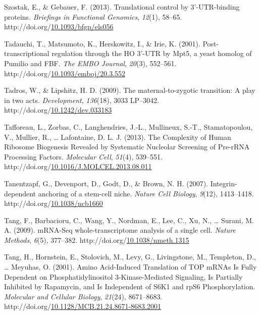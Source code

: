 \documentclass[12pt,oneside]{reedthesis}
\newlength{\cslhangindent}
\newenvironment{CSLReferences}[2] %
 {%
  \setlength{\parindent}{0pt}
  \ifodd #1 \everypar{\setlength{\hangindent}{\cslhangindent}}\ignorespaces\fi
  \ifnum #2 > 0
  \setlength{\parskip}{#2\baselineskip}
  \fi
 }%
 {}
\begin{document}
\begin{CSLReferences}{1}{0}
\leavevmode{}%
Szostak, E., \& Gebauer, F. (2013). Translational control by 3'-{UTR-binding} proteins. \emph{Briefings in Functional Genomics}, \emph{12}(1), 58--65. http://doi.org/\href{https://doi.org/10.1093/bfgp/els056}{10.1093/bfgp/els056}

\leavevmode{}%
Tadauchi, T., Matsumoto, K., Herskowitz, I., \& Irie, K. (2001). Post-transcriptional regulation through the {HO} 3'-{UTR} by {Mpt5}, a yeast homolog of {Pumilio} and {FBF}. \emph{The EMBO Journal}, \emph{20}(3), 552--561. http://doi.org/\href{https://doi.org/10.1093/emboj/20.3.552}{10.1093/emboj/20.3.552}

\leavevmode{}%
Tadros, W., \& Lipshitz, H. D. (2009). The maternal-to-zygotic transition: A play in two acts. \emph{Development}, \emph{136}(18), 3033 LP--3042. http://doi.org/\href{https://doi.org/10.1242/dev.033183}{10.1242/dev.033183}

\leavevmode{}%
Tafforeau, L., Zorbas, C., Langhendries, J.-L., Mullineux, S.-T., Stamatopoulou, V., Mullier, R., \ldots{} Lafontaine, D. L. J. (2013). The {Complexity} of {Human Ribosome Biogenesis Revealed} by {Systematic Nucleolar Screening} of {Pre-rRNA Processing Factors}. \emph{Molecular Cell}, \emph{51}(4), 539--551. http://doi.org/\href{https://doi.org/10.1016/J.MOLCEL.2013.08.011}{10.1016/J.MOLCEL.2013.08.011}

\leavevmode{}%
Tanentzapf, G., Devenport, D., Godt, D., \& Brown, N. H. (2007). Integrin-dependent anchoring of a stem-cell niche. \emph{Nature Cell Biology}, \emph{9}(12), 1413--1418. http://doi.org/\href{https://doi.org/10.1038/ncb1660}{10.1038/ncb1660}

\leavevmode{}%
Tang, F., Barbacioru, C., Wang, Y., Nordman, E., Lee, C., Xu, N., \ldots{} Surani, M. A. (2009). {mRNA-Seq} whole-transcriptome analysis of a single cell. \emph{Nature Methods}, \emph{6}(5), 377--382. http://doi.org/\href{https://doi.org/10.1038/nmeth.1315}{10.1038/nmeth.1315}

\leavevmode{}%
Tang, H., Hornstein, E., Stolovich, M., Levy, G., Livingstone, M., Templeton, D., \ldots{} Meyuhas, O. (2001). Amino {Acid-Induced Translation} of {TOP mRNAs Is Fully Dependent} on {Phosphatidylinositol} 3-{Kinase-Mediated Signaling}, {Is Partially Inhibited} by {Rapamycin}, and {Is Independent} of {S6K1} and {rpS6 Phosphorylation}. \emph{Molecular and Cellular Biology}, \emph{21}(24), 8671--8683. http://doi.org/\href{https://doi.org/10.1128/MCB.21.24.8671-8683.2001}{10.1128/MCB.21.24.8671-8683.2001}


\end{CSLReferences}
\end{document}
